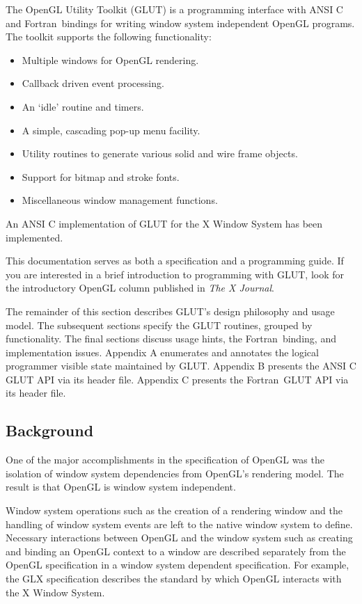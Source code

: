 \def\Fortran{{\sc Fortran}}

The OpenGL Utility Toolkit (GLUT) is a programming interface with ANSI C and
\Fortran\ bindings for writing window system
independent OpenGL programs.  The toolkit supports the following functionality:
\begin{itemize}
\item Multiple windows for OpenGL rendering.
\item Callback driven event processing.
\item An `idle' routine and timers.
\item A simple, cascading pop-up menu facility.
\item Utility routines to generate various solid and wire frame objects.
\item Support for bitmap and stroke fonts.
\item Miscellaneous window management functions.
\end{itemize}
An ANSI C implementation of GLUT for the X Window System \cite{x92} has
been implemented.

This documentation serves as both a specification and a programming guide.
If you are interested in a brief introduction to programming with GLUT,
look for the introductory OpenGL column \cite{kilgard94c}
published in {\em The X Journal}.

The remainder of this section describes GLUT's design philosophy and usage model.
The subsequent sections specify the GLUT routines, grouped by functionality.
The final sections discuss usage hints, the \Fortran\ binding, and implementation issues.
Appendix A enumerates and annotates the logical programmer visible state maintained by GLUT.
Appendix B presents the ANSI C GLUT API via its header file.
Appendix C presents the \Fortran\ GLUT API via its header file.

\subsection{Background}

One of the major accomplishments in the specification of OpenGL \cite{segal92,arb92}
was the
isolation of window system dependencies from OpenGL's rendering model.
The result is that OpenGL is window system independent.

  Window system operations such as
the creation of a rendering window and the handling of window system
events are left to the native window system to define.
Necessary interactions between OpenGL and the window system such as creating
and binding an OpenGL context to
a window are described separately from the OpenGL specification in a
window system dependent specification.  For example, the GLX specification
\cite{karlton93}
describes the standard by which OpenGL interacts with the X Window System.

